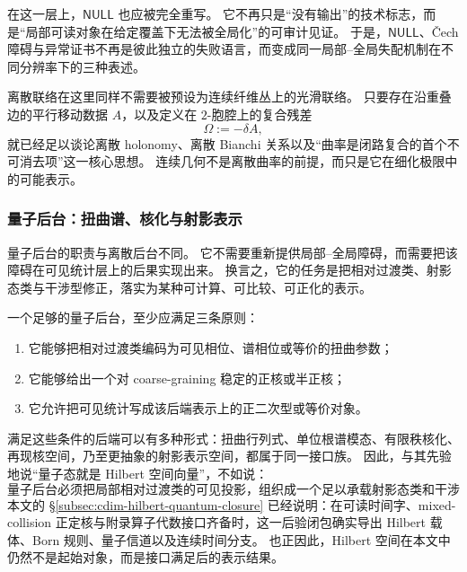在这一层上，\(\mathsf{NULL}\) 也应被完全重写。
它不再只是“没有输出”的技术标志，而是“局部可读对象在给定覆盖下无法被全局化”的可审计见证。
于是，\(\mathsf{NULL}\)、\v{C}ech 障碍与异常证书不再是彼此独立的失败语言，而变成同一局部--全局失配机制在不同分辨率下的三种表述。

离散联络在这里同样不需要被预设为连续纤维丛上的光滑联络。
只要存在沿重叠边的平行移动数据 \(A\)，以及定义在 \(2\)-胞腔上的复合残差
\[
\Omega:=-\delta A,
\]
就已经足以谈论离散 holonomy、离散 Bianchi 关系以及“曲率是闭路复合的首个不可消去项”这一核心思想。
连续几何不是离散曲率的前提，而只是它在细化极限中的可能表示。

\subsubsection{量子后台：扭曲谱、核化与射影表示}
量子后台的职责与离散后台不同。
它不需要重新提供局部--全局障碍，而需要把该障碍在可见统计层上的后果实现出来。
换言之，它的任务是把相对过渡类、射影态类与干涉型修正，落实为某种可计算、可比较、可正化的表示。

一个足够的量子后台，至少应满足三条原则：
\begin{enumerate}
  \item 它能够把相对过渡类编码为可见相位、谱相位或等价的扭曲参数；
  \item 它能够给出一个对 coarse-graining 稳定的正核或半正核；
  \item 它允许把可见统计写成该后端表示上的正二次型或等价对象。
\end{enumerate}

满足这些条件的后端可以有多种形式：扭曲行列式、单位根谱模态、有限秩核化、再现核空间，乃至更抽象的射影表示空间，都属于同一接口族。
因此，与其先验地说“量子态就是 Hilbert 空间向量”，不如说：
\[
\text{量子后台必须把局部相对过渡类的可见投影，组织成一个足以承载射影态类和干涉项的正表示。}
\]
本文的 \S\ref{subsec:cdim-hilbert-quantum-closure} 已经说明：在可读时间字、mixed-collision 正定核与附录算子代数接口齐备时，这一后验闭包确实导出 Hilbert 载体、Born 规则、量子信道以及连续时间分支。
也正因此，Hilbert 空间在本文中仍然不是起始对象，而是接口满足后的表示结果。

